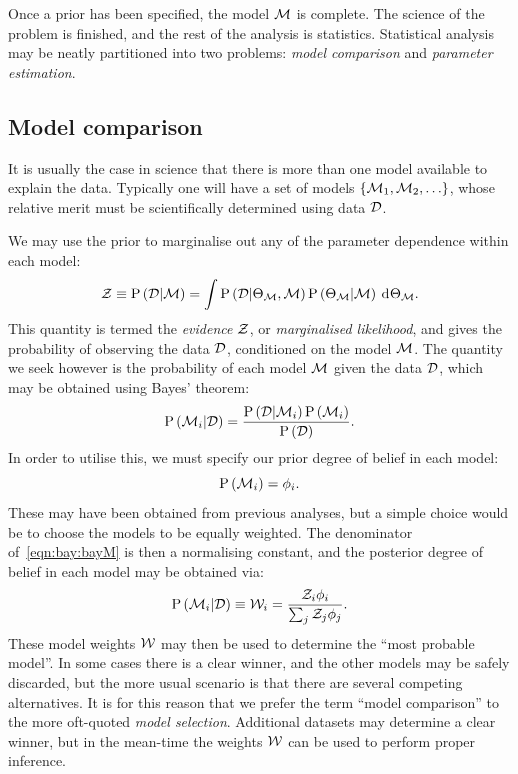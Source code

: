 Once a prior has been specified, the model \(\mathcal{M}\) is complete. The science of the problem is finished, and the rest of the analysis is statistics. Statistical analysis may be neatly partitioned into two problems: {\em model comparison\/} and {\em parameter estimation}.

\subsection{Model comparison}
It is usually the case in science that there is more than one model available to explain the data. Typically one will have a set of models \({\{\mathcal{M}_1,\mathcal{M}_2,\ldots\}}\), whose relative merit must be scientifically determined using data \(\mathcal{D}\).

We may use the prior to marginalise out any of the parameter dependence within each model:
\begin{equation}
  \mathcal{Z}\equiv\mathrm{P}\left(\mathcal{D}\middle|\mathcal{M}\right) 
  =
  \int  \mathrm{P}\left(\mathcal{D}\middle|\Theta_{\mathcal{M}},\mathcal{M}\right)\mathrm{P}\left(\Theta_{\mathcal{M}}\middle|\mathcal{M}\right)\:\operatorname{d}^{}\!{\Theta_{\mathcal{M}}}.
  \label{eqn:bay:ev_def}
\end{equation}
This quantity is termed the {\em evidence\/} \(\mathcal{Z}\), or {\em marginalised likelihood}, and gives the probability of observing the data \(\mathcal{D}\), conditioned on the model \(\mathcal{M}\). The quantity we seek however is the probability of each model \(\mathcal{M}\) given the data \(\mathcal{D}\), which may be obtained using Bayes' theorem:
\begin{equation}
  \mathrm{P}\left(\mathcal{M}_i\middle|\mathcal{D}\right) = \frac{\mathrm{P}\left(\mathcal{D}\middle|\mathcal{M}_i\right)\mathrm{P}\left(\mathcal{M}_i\right)}{\mathrm{P}\left(\mathcal{D}\right)}.
  \label{eqn:bay:bayM}
\end{equation}
In order to utilise this, we must specify our prior degree of belief in each model:
\begin{equation}
  \mathrm{P}\left(\mathcal{M}_i\right) = \phi_i.
\end{equation}
These may have been obtained from previous analyses, but a simple choice would be to choose the models to be equally weighted. The denominator of~\eqref{eqn:bay:bayM} is then a normalising constant, and the posterior degree of belief in each model may be obtained via:
\begin{equation}
  \mathrm{P}\left(\mathcal{M}_i\middle|\mathcal{D}\right) 
  \equiv
  \mathcal{W}_i
  =
  \frac{\mathcal{Z}_i\phi_i}{\sum_j \mathcal{Z}_j\phi_j}.
\end{equation}
These model weights \(\mathcal{W}\) may then be used to determine the ``most probable model''. In some cases there is a clear winner, and the other models may be safely discarded, but the more usual scenario is that there are several competing alternatives. It is for this reason that we prefer the term ``model comparison'' to the more oft-quoted {\em model selection}. Additional datasets may determine a clear winner, but in the mean-time the weights \(\mathcal{W}\) can be used to perform proper inference. 

